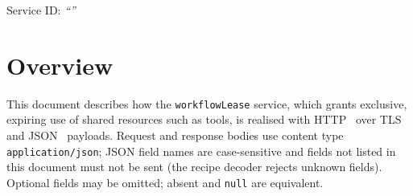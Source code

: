\documentclass[a4paper]{arrowhead}
\begin{document}
\ArrowheadSetup

\begin{center}
  \vspace*{1cm}
  \huge{\arrowtitle}

  \vspace*{0.2cm}
  \LARGE{\arrowtype}
  \vspace*{1cm}

  \Large{Service ID: \textit{``\arrowid''}}
  \vspace*{\fill}

  

  \vspace*{1cm}
  \vspace*{\fill}

  \begin{abstract}
    This document describes the HTTP/TLS/JSON interface of the \texttt{workflowLease} service of the Eclipse Arrowhead workflow support systems, service version 1.0.0, documentation edition 5.4.0. It realises the abstract operations of the \texttt{workflowLease} SD.
  \end{abstract}

  \vspace*{1cm}
\end{center}

\newpage

\tableofcontents
\newpage

\section{Overview}
\label{sec:overview}
This document describes how the \texttt{workflowLease} service, which grants exclusive, expiring use of shared resources such as tools, is realised with HTTP~\cite{rfc9110}
over TLS~\cite{rfc8446} and JSON~\cite{rfc8259} payloads. Request and response bodies use content type
\texttt{application/json}; JSON field names are case-sensitive and fields not listed in this document must not be sent
(the recipe decoder rejects unknown fields). Optional fields may be omitted; absent and \texttt{null} are equivalent.
\end{document}
